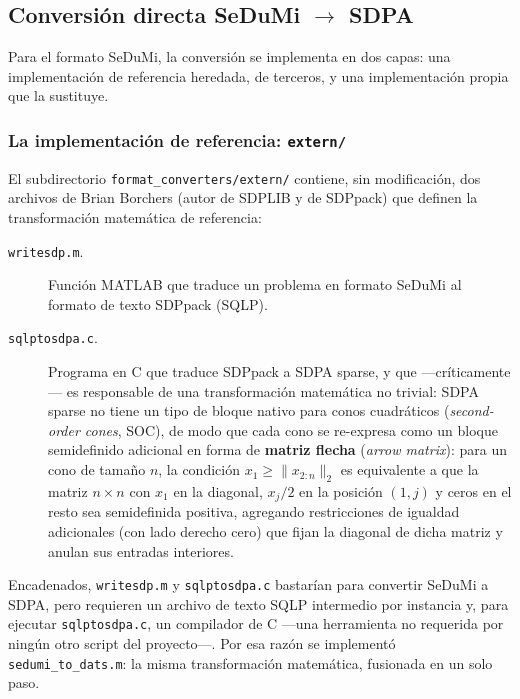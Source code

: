 \subsection{Conversi\'on directa SeDuMi $\to$ SDPA}
\label{sec:cap3-sedumi-converter}

Para el formato SeDuMi, la conversi\'on se implementa en dos capas: una
implementaci\'on de referencia heredada, de terceros, y una implementaci\'on
propia que la sustituye.

\subsubsection{La implementaci\'on de referencia: \texttt{extern/}}

El subdirectorio \texttt{format\_converters/extern/} contiene, sin
modificaci\'on, dos archivos de Brian Borchers (autor de SDPLIB y de
SDPpack) que definen la transformaci\'on matem\'atica de referencia:

\begin{description}
    \item[\texttt{writesdp.m}.] Funci\'on MATLAB que traduce un problema en
    formato SeDuMi al formato de texto SDPpack (SQLP).
    \item[\texttt{sqlptosdpa.c}.] Programa en C que traduce SDPpack a SDPA
    sparse, y que —cr\'iticamente— es responsable de una transformaci\'on
    matem\'atica no trivial: SDPA sparse no tiene un tipo de bloque nativo
    para conos cuadr\'aticos (\emph{second-order cones}, SOC), de modo que
    cada cono se re-expresa como un bloque semidefinido adicional en forma
    de \textbf{matriz flecha} (\emph{arrow matrix}): para un cono de tama\~no
    $n$, la condici\'on $x_1 \geq \|x_{2:n}\|_2$ es equivalente a que la
    matriz $n \times n$ con $x_1$ en la diagonal, $x_j/2$ en la posici\'on
    $(1,j)$ y ceros en el resto sea semidefinida positiva, agregando
    restricciones de igualdad adicionales (con lado derecho cero) que fijan
    la diagonal de dicha matriz y anulan sus entradas interiores.
\end{description}

Encadenados, \texttt{writesdp.m} y \texttt{sqlptosdpa.c} bastar\'ian para
convertir SeDuMi a SDPA, pero requieren un archivo de texto SQLP
intermedio por instancia y, para ejecutar \texttt{sqlptosdpa.c}, un
compilador de C —una herramienta no requerida por ning\'un otro script del
proyecto—. Por esa raz\'on se implement\'o \texttt{sedumi\_to\_dats.m}: la
misma transformaci\'on matem\'atica, fusionada en un solo paso.

